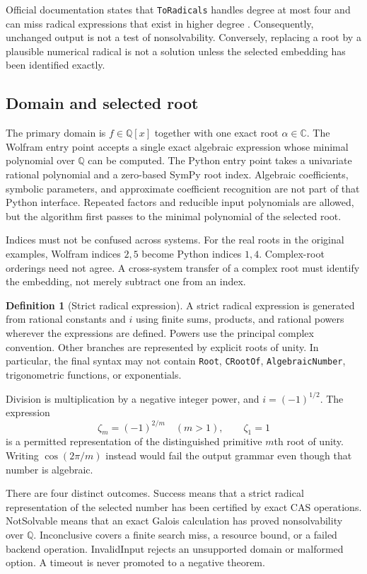\documentclass[11pt,letterpaper]{article}
\theoremstyle{definition}\newtheorem{definition}[theorem]{Definition}
\theoremstyle{remark}\newtheorem{remark}[theorem]{Remark}
\newcommand{\Q}{\mathbb Q}
\newcommand{\C}{\mathbb C}
\newcommand{\code}[1]{\texttt{#1}}
\newcommand{\status}[1]{\textsf{#1}}
\begin{document}
Official documentation states that \code{ToRadicals} handles degree at most
four and can miss radical expressions that exist in higher degree
\cite{toradicals}. Consequently, unchanged output is not a test of
nonsolvability. Conversely, replacing a root by a plausible numerical radical
is not a solution unless the selected embedding has been identified exactly.

\subsection{Domain and selected root}
The primary domain is $f\in\Q[x]$ together with one exact root $\alpha\in\C$.
The Wolfram entry point accepts a single exact algebraic expression whose
minimal polynomial over $\Q$ can be computed. The Python entry point takes a
univariate rational polynomial and a zero-based SymPy root index. Algebraic
coefficients, symbolic parameters, and approximate coefficient recognition
are not part of that Python interface. Repeated factors and reducible input
polynomials are allowed, but the algorithm first passes to the minimal
polynomial of the selected root.

Indices must not be confused across systems. For the real roots in the
original examples, Wolfram indices $2,5$ become Python indices $1,4$.
Complex-root orderings need not agree. A cross-system transfer of a complex
root must identify the embedding, not merely subtract one from an index.

\begin{definition}[Strict radical expression]
A strict radical expression is generated from rational constants and $i$
using finite sums, products, and rational powers wherever the expressions
are defined. Powers use the principal complex convention. Other branches
are represented by explicit roots of unity. In particular, the final syntax
may not contain \code{Root}, \code{CRootOf}, \code{AlgebraicNumber},
trigonometric functions, or exponentials.
\end{definition}
Division is multiplication by a negative integer power, and
$i=(-1)^{1/2}$. The expression
\begin{equation}\label{eq:zeta}
 \zeta_m=(-1)^{2/m}\quad(m>1),\qquad \zeta_1=1
\end{equation}
is a permitted representation of the distinguished primitive $m$th root of
unity. Writing $\cos(2\pi/m)$ instead would fail the output grammar even
though that number is algebraic.

There are four distinct outcomes. \status{Success} means that a strict
radical representation of the selected number has been certified by exact
CAS operations. \status{NotSolvable} means that an exact Galois calculation
has proved nonsolvability over $\Q$. \status{Inconclusive} covers a finite
search miss, a resource bound, or a failed backend operation.
\status{InvalidInput} rejects an unsupported domain or malformed option.
A timeout is never promoted to a negative theorem.
\end{document}
